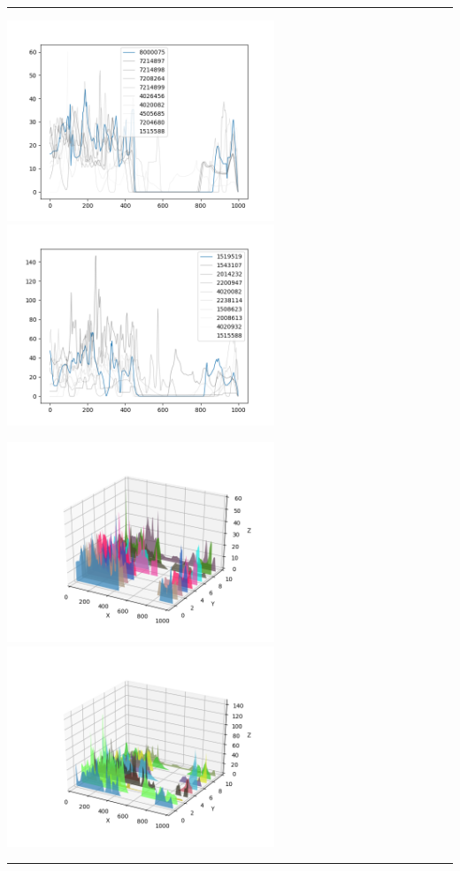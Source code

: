 \documentclass{article}
\begin{document}
\begin{center}
\noindent\rule{\textwidth}{1pt}

\includegraphics[height=6cm, width=8cm]{10.png}\includegraphics[height=6cm, width=8cm]{10_cos.png}

\includegraphics[height=6cm, width=8cm]{10_3d.png} \includegraphics[height=6cm, width=8cm]{10_cos_3d.png}

\noindent\rule{\textwidth}{1pt}

\end{center}
\end{document}
